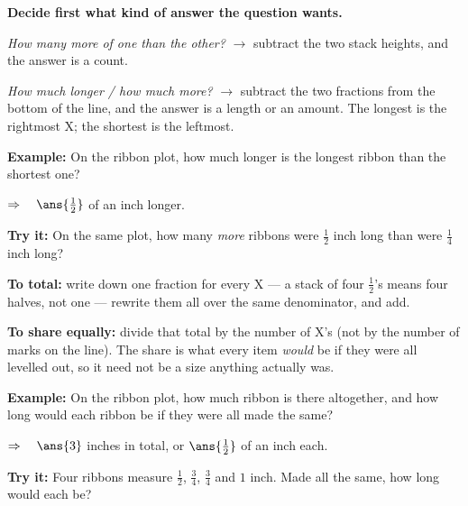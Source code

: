 \documentclass[12pt]{article}
\begin{document}
\begin{formulabox}
\textbf{Decide first what kind of answer the question wants.}\par
\smallskip
\emph{How many more of one than the other?} $\rightarrow$ subtract the two stack heights, and
the answer is a count.\par
\smallskip
\emph{How much longer / how much more?} $\rightarrow$ subtract the two fractions from the
bottom of the line, and the answer is a length or an amount. The longest is the rightmost
\textsf{X}; the shortest is the leftmost.
\end{formulabox}

\begin{examplebox}
\textbf{Example:} \quad On the ribbon plot, how much longer is the longest ribbon than the
shortest one?

$\Rightarrow\quad \ans{\tfrac{1}{2}}$ of an inch longer.
\end{examplebox}

\begin{tryitbox}
\textbf{Try it:} \quad On the same plot, how many \emph{more} ribbons were $\frac{1}{2}$ inch
long than were $\frac{1}{4}$ inch long?\\[2pt]
\end{tryitbox}


\begin{formulabox}
\textbf{To total:} write down one fraction for every \textsf{X} --- a stack of four
$\frac{1}{2}$'s means four halves, not one --- rewrite them all over the same denominator, and
add.\par
\smallskip
\textbf{To share equally:} divide that total by the number of \textsf{X}'s (not by the number
of marks on the line). The share is what every item \emph{would} be if they were all levelled
out, so it need not be a size anything actually was.
\end{formulabox}

\begin{examplebox}
\textbf{Example:} \quad On the ribbon plot, how much ribbon is there altogether, and how long
would each ribbon be if they were all made the same?

$\Rightarrow\quad \ans{3}$ inches in total, or $\ans{\tfrac{1}{2}}$ of an inch each.
\end{examplebox}

\begin{tryitbox}
\textbf{Try it:} \quad Four ribbons measure $\frac{1}{2}$, $\frac{3}{4}$, $\frac{3}{4}$ and
$1$ inch. Made all the same, how long would each be?\\[2pt]
\end{tryitbox}
\end{document}

